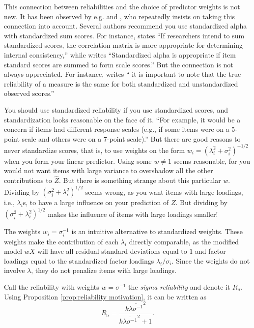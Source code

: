 \documentclass[twoside]{article}
\begin{document}
This connection between reliabilities and the choice of predictor
weights is not new. It has been observed by e.g. \citet[][p. 112]{Joreskog1971-nn} and \citet{McNeish2018-vu}, who repeatedly insists on taking this connection into account. Several authors recommend you use standardized alpha with standardized sum scores. For instance, \citet[][p. 451]{Falk2011-ae} states \enquote{If researchers intend to sum
standardized scores, the correlation matrix is more appropriate for determining internal consistency,} while \citet[][p. 99]{Cortina1993-aq} writes \enquote{Standardized alpha is appropriate if item standard scores are summed to form scale scores.} But the connection is not always appreciated. For instance, \citet[][p.348]{Osburn2000-jd} writes
\enquote{\textelp{} it is important to note that the true reliability of a measure is the same for both standardized and unstandardized observed scores.}

You should use standardized reliability if you use standardized scores, and standardization looks reasonable on the face of it. \enquote{For example, it would be a concern if items had different response scales (e.g., if some items were on a 5-point scale and others were on a 7-point scale).} \citep[p. 139]{Furr2013-yu} But there are good reasons to never standardize scores, that is, to use weights on the form $w_{i}=(\lambda_{i}^{2}+\sigma_{i}^{2})^{-1/2}$ when you form your linear predictor.
Using some $w\ne1$ seems reasonable, for you would not want items
with large variance to overshadow all the other contributions to $\hat{Z}$.
But there is something strange about this particular $w$. Dividing by $(\sigma_{i}^{2}+\lambda_{i}^{2})^{1/2}$
seems wrong, as you want items with large loadings, i.e., $\lambda_{i}$s, to have a large
influence on your prediction of $Z$. But dividing by $(\sigma_{i}^{2}+\lambda_{i}^{2})^{1/2}$
makes the influence of items with large loadings smaller!

The weights $w_i=\sigma_{i}^{-1}$ is an intuitive alternative to standardized weights. These weights make the contribution of each $\lambda_i$ directly comparable, as the modified model $wX$ will have all residual standard deviations equal to $1$ and factor loadings equal to the standardized factor loadings $\lambda_i/\sigma_i$. Since the weights do not involve $\lambda$, they do not penalize items with large loadings. 

Call the reliability with weights $w=\sigma^{-1}$ the \textit{sigma reliability} and denote it $ R_\sigma$. Using Proposition \ref{prop:reliability motivation}, it can be written as
\begin{equation}
 R_\sigma=\frac{k\overline{\lambda\sigma^{-1}}^{2}}{k\overline{\lambda\sigma^{-1}}^{2}+1}.\label{eq:Sigma-standardized reliability}
\end{equation}
\end{document}
